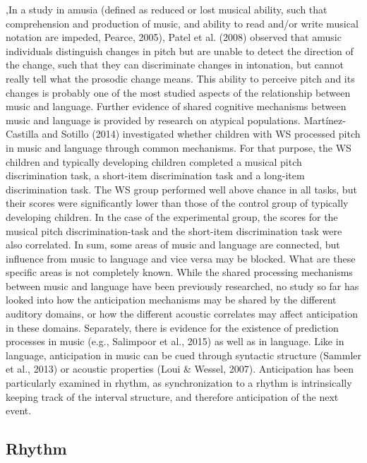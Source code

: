 \documentclass[english,man]{apa6}
\begin{document}
,In a study in amusia (defined as reduced or lost musical ability, such that comprehension and production of music, and ability to read and/or write musical notation are impeded, Pearce, 2005), Patel et al. (2008) observed that amusic individuals distinguish changes in pitch but are unable to detect the direction of the change, such that they can discriminate changes in intonation, but cannot really tell what the prosodic change means. This ability to perceive pitch and its changes is probably one of the most studied aspects of the relationship between music and language. Further evidence of shared cognitive mechanisms between music and language is provided by research on atypical populations. Martínez-Castilla and Sotillo (2014) investigated whether children with WS processed pitch in music and language through common mechanisms. For that purpose, the WS children and typically developing children completed a musical pitch discrimination task, a short-item discrimination task and a long-item discrimination task. The WS group performed well above chance in all tasks, but their scores were significantly lower than those of the control group of typically developing children. In the case of the experimental group, the scores for the musical pitch discrimination-task and the short-item discrimination task were also correlated.
In sum, some areas of music and language are connected, but influence from music to language and vice versa may be blocked. What are these specific areas is not completely known. While the shared processing mechanisms between music and language have been previously researched, no study so far has looked into how the anticipation mechanisms may be shared by the different auditory domains, or how the different acoustic correlates may affect anticipation in these domains. Separately, there is evidence for the existence of prediction processes in music (e.g., Salimpoor et al., 2015) as well as in language. Like in language, anticipation in music can be cued through syntactic structure (Sammler et al., 2013) or acoustic properties (Loui \& Wessel, 2007). Anticipation has been particularly examined in rhythm, as synchronization to a rhythm is intrinsically keeping track of the interval structure, and therefore anticipation of the next event.

\hypertarget{rhythm}{%
\subsection{Rhythm}\label{rhythm}}
\end{document}

